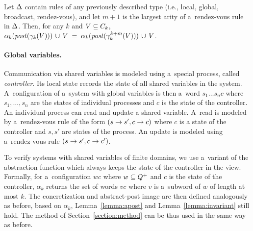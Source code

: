 \begin{lemma}
\label{lemma:rendez-vous}
Let $\rules$ contain rules of any previously described type (i.e.,
local, global, broadcast, rendez-vous), and let $m+1$ is the largest
arity of a~rendez-vous rule in $\rules$.  Then, for any $k$ and
$\X\subseteq\viewsof k$, $\projof {\postof {\gammaof k (\X)}} k\,
\cup\, V\; =\; \projof {\postof {\limgammaof k {k+m} (\X)}} k\,
\cup\, V$.
\end{lemma}



\paragraph{Global variables.}
Communication via shared variables is modeled using a~special
process, called \emph{controller}. Its local state records the state
of all shared variables in the system.  A~configuration of a~system
with global variables is then a~word $s_1\ldots s_nc$ where
$s_1,\ldots,s_n$ are the states of individual processes and $c$ is the state
of the controller. An individual process can read and update a shared
variable.
%
A~read is modeled by a~rendez-vous rule of the form $(s\trans
s',c\trans c)$ where $c$ is a state of the controller and $s,s'$ are
states of the process. An update is modeled using a~rendez-vous rule
$(s\trans s',c\trans c')$.

To verify systems with shared variables of finite domains, we use
a~variant of the abstraction function which always keeps the state of
the controller in the view.
%
Formally, for a~configuration $wc$ where $w\subseteq\locs^+$ and $c$
is the state of the controller, $\alpha_k$ returns the set of words $vc$
where $v$ is a~subword of $w$ of length at most $k$. The concretization and
abstract-post image are then defined analogously as before, based on
$\alpha_k$, Lemma~\ref{lemma:apost} and Lemma~\ref{lemma:invariant}
still hold. The method of Section~\ref{section:method} can be thus
used in the same way as before.


